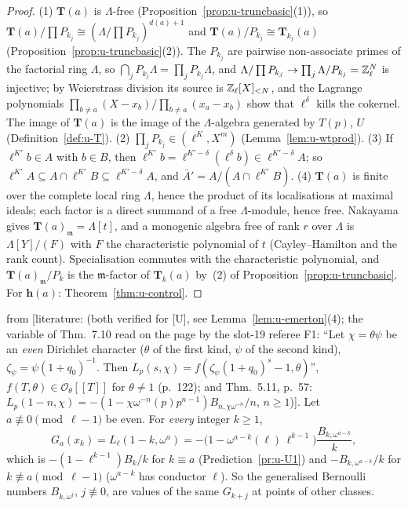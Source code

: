 \documentclass[11pt]{article}
\newcommand{\LIT}[1]{\textsf{[literature: #1]}}   %
\newcommand{\Iw}{\Lambda}                         %
\newcommand{\hcusp}{\mathbf{h}}                   %
\newcommand{\Tu}{\mathbf{T}}                      %
\newcommand{\Pk}[1]{P_{#1}}                       %
\newcommand{\Zl}{\Z_\ell}
\begin{document}
\begin{proof}
(1) $\Tu(a)$ is $\Iw$-free (Proposition~\ref{prop:u-truncbasic}(1)), so $\Tu(a)/\prod\Pk{k_j}\cong(\Iw/\prod\Pk{k_j})^{d(a)+1}$ and $\Tu(a)/\Pk{k_j}\cong\Tu_{k_j}(a)$
(Proposition~\ref{prop:u-truncbasic}(2)). The $\Pk{k_j}$ are pairwise non-associate primes of the factorial ring $\Iw$, so $\bigcap_j\Pk{k_j}\Iw=\prod_j\Pk{k_j}\Iw$, and
$\Iw/\prod\Pk{k_j}\to\prod_j\Iw/\Pk{k_j}=\Zl^{N}$ is injective; by Weierstrass division its source is $\Zl[X]_{<N}$, and the Lagrange polynomials
$\prod_{b\ne a}(X-x_b)/\prod_{b\ne a}(x_a-x_b)$ show that $\ell^{\delta}$ kills the cokernel. The image of $\Tu(a)$ is the image of the $\Iw$-algebra generated by
$T(p)$, $U$ (Definition~\ref{def:u-T}). (2) $\prod_j\Pk{k_j}\in(\ell^{K},X^{m})$ (Lemma~\ref{lem:u-wtprod}). (3) If $\ell^{K'}b\in A$ with $b\in B$, then
$\ell^{K'}b=\ell^{K'-\delta}(\ell^{\delta}b)\in\ell^{K'-\delta}A$; so $\ell^{K'}A\subseteq A\cap\ell^{K'}B\subseteq\ell^{K'-\delta}A$, and $\bar A'=A/(A\cap\ell^{K'}B)$.
(4) $\Tu(a)$ is finite over the complete local ring $\Iw$, hence the product of its localisations at maximal ideals; each factor is a direct summand of a
free $\Iw$-module, hence free. Nakayama gives $\Tu(a)_{\mathfrak m}=\Iw[t]$, and a monogenic algebra free of rank $r$ over $\Iw$ is $\Iw[Y]/(F)$ with $F$ the
characteristic polynomial of $t$ (Cayley--Hamilton and the rank count). Specialisation commutes with the characteristic polynomial, and
$\Tu(a)_{\mathfrak m}/\Pk{k}$ is the $\mathfrak m$-factor of $\Tu_k(a)$ by~(2) of Proposition~\ref{prop:u-truncbasic}. For $\hcusp(a)$: Theorem~\ref{thm:u-control}.
\end{proof}

\begin{lemma}\label{lem:u-twistvalues}
\PROVED{} from \LIT{\cite[Thm.~5.11, p.~57; Thm.~7.10, p.~123]{washington1st} (both verified for [U], see Lemma~\ref{lem:u-emerton}(4); the
variable of Thm.~7.10 read on the page by the slot-19 referee F1: ``Let $\chi=\theta\psi$ be an \emph{even} Dirichlet character ($\theta$ of the first kind, $\psi$ of the
second kind), $\zeta_\psi=\psi(1+q_0)^{-1}$. Then $L_p(s,\chi)=f(\zeta_\psi(1+q_0)^{s}-1,\theta)$'', $f(T,\theta)\in\mathcal O_\theta[[T]]$ for $\theta\ne1$ (p.~122);
and Thm.~5.11, p.~57: $L_p(1-n,\chi)=-(1-\chi\omega^{-n}(p)p^{n-1})B_{n,\chi\omega^{-n}}/n$, $n\ge1$)}. Let $a\not\equiv0\pmod{\ell-1}$ be even. For \emph{every} integer
$k\ge1$,
\[
  G_a(x_k)=L_\ell(1-k,\omega^{a})=-\bigl(1-\omega^{a-k}(\ell)\,\ell^{k-1}\bigr)\frac{B_{k,\omega^{a-k}}}{k},
\]
which is $-(1-\ell^{k-1})B_k/k$ for $k\equiv a$ (Prediction~\ref{pr:u-U1}) and $-B_{k,\omega^{a-k}}/k$ for $k\not\equiv a\pmod{\ell-1}$ ($\omega^{a-k}$ has conductor $\ell$).
So the generalised Bernoulli numbers $B_{k,\omega^{j}}$, $j\not\equiv0$, are values of the same $G_{k+j}$ at points of other classes.
\end{lemma}
\end{document}
